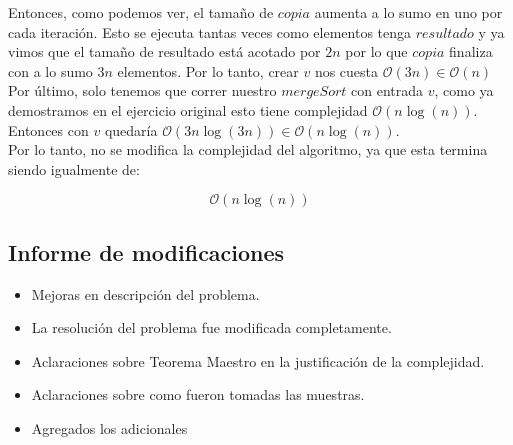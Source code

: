 \begin{enumerate}
\begin{itemize}
\end{itemize}
Entonces, como podemos ver, el tamaño de $copia$ aumenta a lo sumo en uno por cada iteración. Esto se ejecuta tantas veces como elementos tenga $resultado$ y ya vimos que el tamaño de resultado está acotado por $2n$ por lo que $copia$ finaliza con a lo sumo $3n$ elementos. Por lo tanto, crear $v$ nos cuesta $\mathcal{O}(3n) \in \mathcal{O}(n)$\\

Por último, solo tenemos que correr nuestro $mergeSort$ con entrada $v$, como ya demostramos en el ejercicio original esto tiene complejidad $\mathcal{O}(n\log(n))$. Entonces con $v$ quedaría $\mathcal{O}(3n\log(3n)) \in \mathcal{O}(n\log(n))$. \\

Por lo tanto, no se modifica la complejidad del algoritmo, ya que esta termina siendo igualmente de:

$$\mathcal{O}(n\log(n))$$

\end{enumerate}


\subsection{Informe de modificaciones}
    \begin{itemize}
    \item Mejoras en descripción del problema.
    \item La resolución del problema fue modificada completamente.
    \item Aclaraciones sobre Teorema Maestro en la justificación de la complejidad.
    \item Aclaraciones sobre como fueron tomadas las muestras.
    \item Agregados los adicionales
\end{itemize}